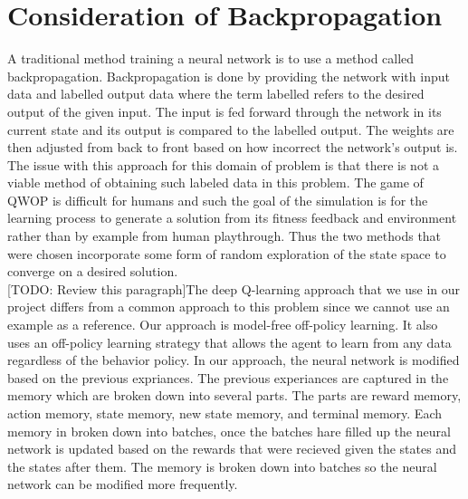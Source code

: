 \documentclass[letterpaper]{article} %
\begin{document}
\section{Consideration of Backpropagation}
A traditional method training a neural network is to use a method called backpropagation. Backpropagation is done by providing the network with input data and labelled output data where the term labelled refers to the desired output of the given input. The input is fed forward through the network in its current state and its output is compared to the labelled output. The weights are then adjusted from back to front based on how incorrect the network's output is. \\
\indent The issue with this approach for this domain of problem is that there is not a viable method of obtaining such labeled data in this problem. The game of QWOP is difficult for humans and such the goal of the simulation is for the learning process to generate a solution from its fitness feedback and environment rather than by example from human playthrough. Thus the two methods that were chosen incorporate some form of random exploration of the state space to converge on a desired solution.\\

[TODO: Review this paragraph]The deep Q-learning approach that we use in our project differs from a common approach to this problem since we cannot use an example as a reference. Our approach is model-free off-policy learning. It also uses an off-policy learning strategy that allows the agent to learn from any data regardless of the behavior policy. In our approach, the neural network is modified based on the previous expriances. The previous experiances are captured in the memory which are broken down into several parts. The parts are reward memory, action memory, state memory, new state memory, and terminal memory. Each memory in broken down into batches, once the batches hare filled up the neural network is updated based on the rewards that were recieved given the states and the states after them. The memory is broken down into batches so the neural network can be modified more frequently.\\
\end{document}
